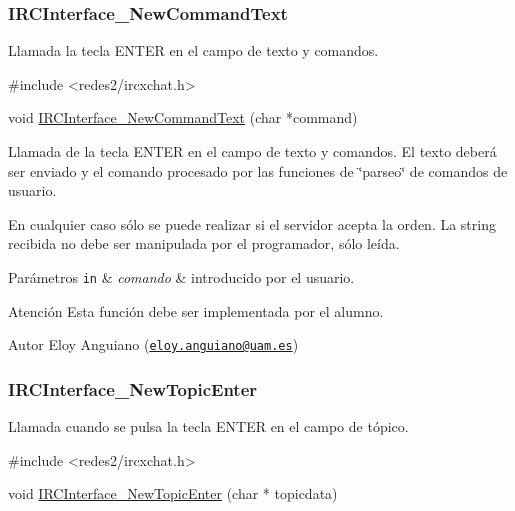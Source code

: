  \hypertarget{IRCInterface_NewCommandText}{}\subsubsection{I\+R\+C\+Interface\+\_\+\+New\+Command\+Text}\label{IRCInterface_NewCommandText}
Llamada la tecla E\+N\+T\+ER en el campo de texto y comandos.


\begin{DoxyCode}
\textcolor{preprocessor}{#include <redes2/ircxchat.h>}

\textcolor{keywordtype}{void} \hyperlink{G-2313-06-P2__client_8c_a214e10b19c8be028fb35d2a7abf3f798}{IRCInterface\_NewCommandText} (\textcolor{keywordtype}{char} *command)
\end{DoxyCode}


Llamada de la tecla E\+N\+T\+ER en el campo de texto y comandos. El texto deberá ser enviado y el comando procesado por las funciones de \char`\"{}parseo\char`\"{} de comandos de usuario.

En cualquier caso sólo se puede realizar si el servidor acepta la orden. La string recibida no debe ser manipulada por el programador, sólo leída.


\begin{DoxyParams}[1]{Parámetros}
\mbox{\tt in}  & {\em comando} & introducido por el usuario.\\
\hline
\end{DoxyParams}
\begin{DoxyWarning}{Atención}
Esta función debe ser implementada por el alumno.
\end{DoxyWarning}
\begin{DoxyAuthor}{Autor}
Eloy Anguiano (\href{mailto:eloy.anguiano@uam.es}{\tt eloy.\+anguiano@uam.\+es})
\end{DoxyAuthor}


 \hypertarget{IRCInterface_NewTopicEnter}{}\subsubsection{I\+R\+C\+Interface\+\_\+\+New\+Topic\+Enter}\label{IRCInterface_NewTopicEnter}
Llamada cuando se pulsa la tecla E\+N\+T\+ER en el campo de tópico.


\begin{DoxyCode}
\textcolor{preprocessor}{#include <redes2/ircxchat.h>}

\textcolor{keywordtype}{void} \hyperlink{G-2313-06-P2__client_8c_a080cf34ff506481737f6d08af60ca92b}{IRCInterface\_NewTopicEnter} (\textcolor{keywordtype}{char} * topicdata)
\end{DoxyCode}


